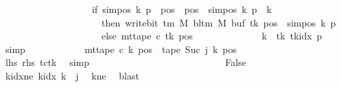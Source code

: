 \begin{isabellebody}
\ \ \ \ \ \ \ \ \ \ \ \ \ \ \ \ \ \ {\isacharequal}{\kern0pt}\ {\isacharparenleft}{\kern0pt}if\ sim{\isacharunderscore}{\kern0pt}pos\ {\isacharquery}{\kern0pt}k\ {\isacharquery}{\kern0pt}p\ {\isasymle}\ pos\ {\isasymand}\ pos\ {\isacharless}{\kern0pt}\ sim{\isacharunderscore}{\kern0pt}pos\ {\isacharquery}{\kern0pt}k\ {\isacharquery}{\kern0pt}p\ {\isacharplus}{\kern0pt}\ {\isacharquery}{\kern0pt}k\isanewline
\ \ \ \ \ \ \ \ \ \ \ \ \ \ \ \ \ \ \ \ \ then\ write{\isacharunderscore}{\kern0pt}bit\ {\isacharparenleft}{\kern0pt}{\isasymGamma}{\isacharunderscore}{\kern0pt}tm\ M{\isacharparenright}{\kern0pt}\ {\isacharparenleft}{\kern0pt}bl{\isacharunderscore}{\kern0pt}tm\ M{\isacharparenright}{\kern0pt}\ {\isacharparenleft}{\kern0pt}buf\ {\isacharquery}{\kern0pt}tk{\isacharparenright}{\kern0pt}\ {\isacharparenleft}{\kern0pt}pos\ {\isacharminus}{\kern0pt}\ sim{\isacharunderscore}{\kern0pt}pos\ {\isacharquery}{\kern0pt}k\ {\isacharquery}{\kern0pt}p{\isacharparenright}{\kern0pt}\isanewline
\ \ \ \ \ \ \ \ \ \ \ \ \ \ \ \ \ \ \ \ \ else\ mt{\isacharunderscore}{\kern0pt}tape\ c{}\ {\isacharquery}{\kern0pt}tk\ pos{\isacharparenright}{\kern0pt}{\isachardoublequoteclose}\isanewline
\ \ \ \ \ \ \ \ \ \ \ \ \isamarkupfalse%
\ {\isacartoucheopen}k\ {\isacharequal}{\kern0pt}\ {\isacharquery}{\kern0pt}tk{\isacartoucheclose}\ tkidx\ {\isacartoucheopen}{\isacharquery}{\kern0pt}p\ {\isasymnoteq}\ {}{\isacartoucheclose}\ \isamarkupfalse%
\ simp\isanewline
\ \ \ \ \ \ \ \ \ \ \isamarkupfalse%
\ {\isachardoublequoteopen}mt{\isacharunderscore}{\kern0pt}tape\ c{\isacharprime}{\kern0pt}\ k\ pos\ {\isacharequal}{\kern0pt}\ {\isacharquery}{\kern0pt}tape\ {\isacharparenleft}{\kern0pt}Suc\ j{\isacharparenright}{\kern0pt}\ k\ pos{\isachardoublequoteclose}\isanewline
\ \ \ \ \ \ \ \ \ \ \ \ \isamarkupfalse%
\ lhs\ rhs\ tc{\isacharunderscore}{\kern0pt}tk\ \isamarkupfalse%
\ simp\isanewline
\ \ \ \ \ \ \ \ \isamarkupfalse%
\isanewline
\ \ \ \ \ \ \isamarkupfalse%
\isanewline
\ \ \ \ \isamarkupfalse%
\isanewline
\ \ \ \ \ \ \isamarkupfalse%
\ False\isanewline
\ \ \ \ \ \ \isamarkupfalse%
\ kidx{\isacharunderscore}{\kern0pt}ne{\isacharcolon}{\kern0pt}\ {\isachardoublequoteopen}k{\isacharunderscore}{\kern0pt}idx\ k\ {\isasymnoteq}\ j{\isachardoublequoteclose}\ \isamarkupfalse%
\ kne\ \isamarkupfalse%
\ blast\isanewline
\ \ \ \ \ \ \isamarkupfalse%

\end{isabellebody}
